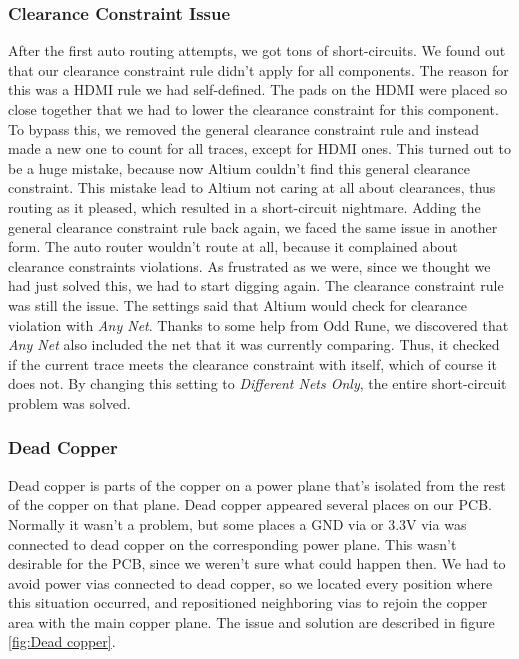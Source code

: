 \subsubsection{Clearance Constraint Issue}
After the first auto routing attempts, we got tons of short-circuits. We found out that our clearance constraint rule didn't apply for all components. The reason for this was a HDMI rule we had self-defined. The pads on the HDMI were placed so close together that we had to lower the clearance constraint for this component. To bypass this, we removed the general clearance constraint rule and instead made a new one to count for all traces, except for HDMI ones. This turned out to be a huge mistake, because now Altium couldn't find this general clearance constraint. This mistake lead to Altium not caring at all about clearances, thus routing as it pleased, which resulted in a short-circuit nightmare.
\newline
\newline
Adding the general clearance constraint rule back again, we faced the same issue in another form. The auto router wouldn't route at all, because it complained about clearance constraints violations. As frustrated as we were, since we thought we had just solved this, we had to start digging again. 
\newline
The clearance constraint rule was still the issue. The settings said that Altium would check for clearance violation with \emph{Any Net}. Thanks to some help from Odd Rune, we discovered that \emph{Any Net} also included the net that it was currently comparing. Thus, it checked if the current trace meets the clearance constraint with itself, which of course it does not. By changing this setting to \emph{Different Nets Only}, the entire short-circuit problem was solved. 

\subsubsection{Dead Copper}
Dead copper is parts of the copper on a power plane that's isolated from the rest of the copper on that plane. 
Dead copper appeared several places on our PCB. Normally it wasn't a problem, but some places a GND via or 3.3V via was connected to dead copper on the corresponding power plane. This wasn't desirable for the PCB, since we weren't sure what could happen then. 
\newline
We had to avoid power vias connected to dead copper, so we located every position where this situation occurred, and repositioned neighboring vias to rejoin the copper area with the main copper plane. The issue and solution are described in figure \ref{fig:Dead copper}.

